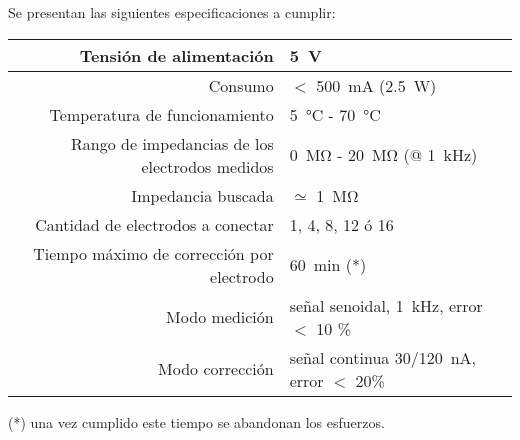 
Se presentan las siguientes especificaciones a cumplir:

\begin{table}[H]
\begin{center}
\begin{tabular}{|r|l|}
    \hline
    Tensión de alimentación &
    \SI{5}{\volt} \\ \hline
    Consumo &
    $<$ \SI{500}{\milli\ampere} (\SI{2.5}{\watt}) \\ \hline
    Temperatura de funcionamiento &
    \SI{5}{\celsius} - \SI{70}{\celsius} \\ \hline
    Rango de impedancias de los electrodos medidos &
    \SI{0}{\mega\ohm} - \SI{20}{\mega\ohm} (@ \SI{1}{\kilo\hertz})\\ \hline
    Impedancia buscada & $\simeq$ \SI{1}{\mega\ohm}\\ \hline
    Cantidad de electrodos a conectar &
    1, 4, 8, 12 ó 16 \\ \hline
    Tiempo máximo de corrección por electrodo &
    \SI{60}{\minute} (*)\\ \hline
    Modo medición & señal senoidal, \SI{1}{\kilo\hertz}, error $<$ 10 \% \\ \hline
    Modo corrección & señal continua \SI{30/120}{\nano\ampere}, error $<$ 20\% \\ \hline
\end{tabular}
\end{center}
\end{table}

(*) una vez cumplido este tiempo se abandonan los esfuerzos.



